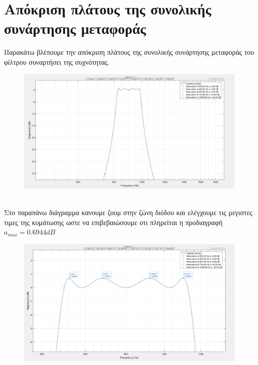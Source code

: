 \documentclass{article}
\begin{document}
{{\section*{Aπόκριση πλάτους της συνολικής συνάρτησης μεταφοράς} 
Παρακάτω βλέπουμε την απόκριση πλάτους της συνολικής συνάρτησης μεταφοράς του φίλτρου συναρτήσει της συχνότητας.
\begin{figure}[h!]
\centering
 	\advance\leftskip-0.1cm
  \includegraphics[width=120mm,scale=2]{thema2/matlab4.jpg}
\end{figure}  \\
Στο παραπάνω διάγραμμα κανουμε ζουμ στην ζώνη διόδου και ελέγχουμε τις μεγιστες τιμες της κυμάτωσης ωστε να επιβεβαιώσουμε οτι πληρείται η προδιαγραφή $a_{max} =0.6944dB$ 
\begin{figure}[h!]
\centering
 	\advance\leftskip-0.1cm
  \includegraphics[width=120mm,scale=2]{thema2/matlab3a.jpg}
\end{figure}
\newpage
}}
\end{document}
